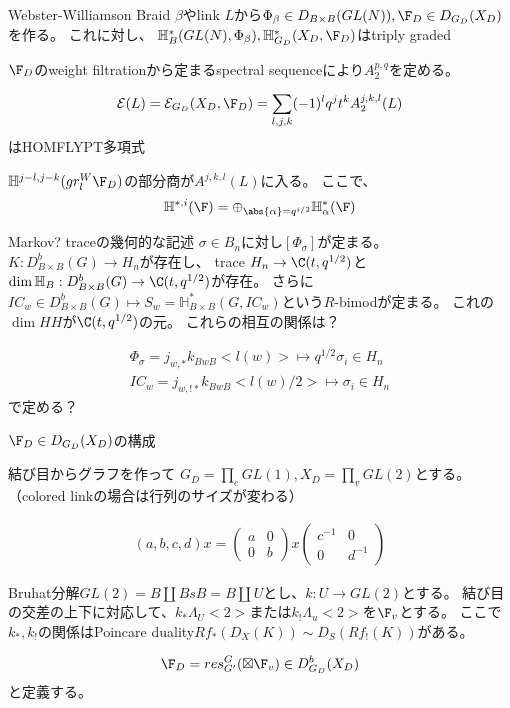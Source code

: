 \documentclass[dvipdfmx]{beamer}
\begin{document}
\begin{frame}{Webster-Williamson}
Braid $\beta$やlink $L$から$\Phi_\beta\in D_{B\times B}(GL(N)), \F_D\in D_{G_D}(X_D)$を作る。
これに対し、
$\mathbb{H}^*_B(GL(N),\Phi_\beta), \mathbb{H}^*_{G_D}(X_D,\F_D)$はtriply graded

$\F_D$のweight filtrationから定まるspectral sequenceにより$A_2^{p,q}$を定める。
\begin{thm}
\begin{align*}
\mathcal{E}(L)=\mathcal{E}_{G_D}(X_D,\F_D)=\sum_{l,j,k}(-1)^lq^jt^kA_2^{j,k,l}(L)
\end{align*}
はHOMFLYPT多項式
\end{thm}

$\mathbb{H}^{j-l,j-k}(gr_l^W\F_D)$の部分商が$A^{j,k,l}(L)$に入る。
ここで、
\begin{align*}
\mathbb{H}^{*,i}(\F)=\oplus_{\abs{\alpha}=q^{i/2}}\mathbb{H}^*_\alpha(\F)
\end{align*}
\end{frame}

\begin{frame}{Markov? traceの幾何的な記述}
$\sigma\in B_n$に対し$[\Phi_\sigma]$が定まる。
$K:D^b_{B\times B}(G)\to H_n$が存在し、
trace $H_n \to \C(t,q^{1/2})$と$\dim \mathbb{H}_B:D^b_{B\times B}(G) \to \C(t,q^{1/2})$が存在。
さらに$IC_w \in D^b_{B\times B}(G) \mapsto S_w=\mathbb{H}^*_{B\times B}(G, IC_w)$という$R$-bimodが定まる。
これの$\dim HH$が$\C(t,q^{1/2})$の元。
これらの相互の関係は？

\begin{align*}
\Phi_\sigma=j_{w,*}k_{BwB}<l(w)>\mapsto q^{1/2}\sigma_i\in H_n\\
IC_w=j_{w,!*}k_{BwB}<l(w)/2>\mapsto \sigma_i\in H_n
\end{align*}
で定める？
\end{frame}

\begin{frame}
$\F_D\in D_{G_D}(X_D)$の構成

結び目からグラフを作って
$G_D=\prod_e GL(1), X_D=\prod_v GL(2)$とする。
（colored linkの場合は行列のサイズが変わる）

\begin{align*}
(a,b,c,d)x=\begin{pmatrix}a&0\\0&b\end{pmatrix}x\begin{pmatrix}c^{-1}&0\\0&d^{-1}\end{pmatrix}
\end{align*}

Bruhat分解$GL(2)=B\amalg BsB=B\amalg U$とし、$k:U \to GL(2)$とする。
結び目の交差の上下に対応して、$k_*\Lambda_U<2>$または$k_!\Lambda_u<2>$を$\F_v$とする。
ここで$k_*, k_!$の関係はPoincare duality$Rf_*(D_X(K))\sim D_S(Rf_!(K))$がある。

\begin{align*}
\F_D=res^G_{G'}(\boxtimes\F_v)\in D^b_{G_D}(X_D)
\end{align*}
と定義する。
\end{frame}
\end{document}
